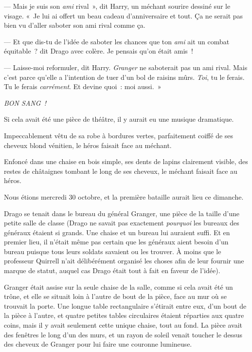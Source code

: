 --- Mais je suis son \emph{ami} rival~», dit Harry, un méchant sourire dessiné sur le visage. «~Je lui ai offert un beau cadeau d'anniversaire et tout. Ça ne serait pas bien vu d'aller saboter son ami rival comme ça.

--- Et que dis-tu de l'idée de saboter les chances que ton \emph{ami} ait un combat équitable~? dit Drago avec colère. Je pensais qu'on était amis~!

--- Laisse-moi reformuler, dit Harry. \emph{Granger} ne saboterait pas un ami rival. Mais c'est parce qu'elle a l'intention de tuer d'un bol de raisins mûrs. \emph{Toi}, tu le ferais. Tu le ferais \emph{carrément}. Et devine quoi~: moi aussi.~»

\emph{BON SANG~!}

\later

Si cela avait été une pièce de théâtre, il y aurait eu une musique dramatique.

Impeccablement vêtu de sa robe à bordures vertes, parfaitement coiffé de ses cheveux blond vénitien, le héros faisait face au méchant.

Enfoncé dans une chaise en bois simple, ses dents de lapins clairement visible, des restes de châtaignes tombant le long de ses cheveux, le méchant faisait face au héros.

Nous étions mercredi 30 octobre, et la première bataille aurait lieu ce dimanche.

Drago se tenait dans le bureau du général Granger, une pièce de la taille d'une petite salle de classe (Drago ne savait pas exactement \emph{pourquoi} les bureaux des généraux étaient si grands. Une chaise et un bureau lui auraient suffi. Et en premier lieu, il n'était même pas certain que les généraux aient besoin d'un bureau puisque tous leurs soldats savaient ou les trouver. À moins que le professeur Quirrell n'ait délibérément organisé les choses afin de leur fournir une marque de statut, auquel cas Drago était tout à fait en faveur de l'idée).

Granger était assise sur la seule chaise de la salle, comme si cela avait été un trône, et elle se situait loin à l'autre de bout de la pièce, face au mur où se trouvait la porte. Une longue table rectangulaire s'étirait entre eux, d'un bout de la pièce à l'autre, et quatre petites tables circulaires étaient réparties aux quatre coins, mais il y avait seulement cette unique chaise, tout au fond. La pièce avait des fenêtres le long d'un des murs, et un rayon de soleil venait toucher le dessus des cheveux de Granger pour lui faire une couronne lumineuse.

